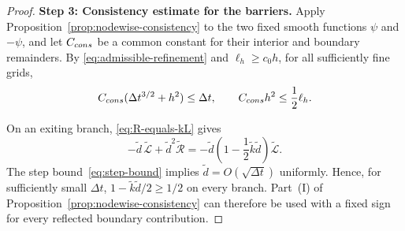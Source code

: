 \documentclass[10pt,a4paper]{amsart}
\begin{document}
\begin{proof}
		\medskip
		\noindent\textbf{Step 3: Consistency estimate for the barriers.}
		Apply Proposition~\ref{prop:nodewise-consistency} to the two fixed smooth
		functions $\psi$ and $-\psi$, and let $C_{\rm cons}$ be a common constant
		for their interior and boundary remainders.  By
		\eqref{eq:admissible-refinement} and $\ell_h\ge c_0h$, for all sufficiently
		fine grids,
		\begin{equation}
			C_{\rm cons}(\Delta t^{3/2}+h^2)\le\Delta t,
			\qquad C_{\rm cons}h^2\le\frac12\ell_h.
			\label{eq:barrier-remainder}
		\end{equation}
		
		On an exiting branch,
		\eqref{eq:R-equals-kL} gives
		\[
		-\widetilde d\,\widetilde{\mathcal L}
		+\widetilde d^2\widetilde{\mathcal R}
		=-\widetilde d\left(1-\frac12\widetilde k\widetilde d\right)
		\widetilde{\mathcal L}.
		\]
		The step bound~\eqref{eq:step-bound} implies
		$\widetilde d=O(\sqrt{\Delta t})$ uniformly.  Hence, for sufficiently small
		$\Delta t$,
		\(
		1-\widetilde k\widetilde d/2\ge1/2
		\)
		on every branch.  Part~\textup{(I)} of
		Proposition~\ref{prop:nodewise-consistency} can therefore be used with a
		fixed sign for every reflected boundary contribution.
		

\end{proof}
\end{document}
